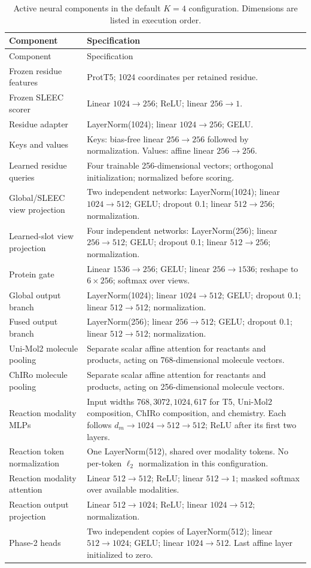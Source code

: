 \begin{longtable}{>{\raggedright\arraybackslash}p{}>{\raggedright\arraybackslash}p{}}
\caption{Active neural components in the default $K=4$ configuration.
Dimensions are listed in execution order.}\label{tab:v4-layers}\\
\toprule
Component & Specification\\
\midrule
\endfirsthead
\toprule Component & Specification\\\midrule
\endhead
Frozen residue features & ProtT5; 1024 coordinates per retained residue.\\
Frozen SLEEC scorer & Linear $1024\to256$; ReLU; linear $256\to1$.\\
Residue adapter & LayerNorm(1024); linear $1024\to256$; GELU.\\
Keys and values & Keys: bias-free linear $256\to256$ followed by normalization. Values: affine linear $256\to256$.\\
Learned residue queries & Four trainable 256-dimensional vectors; orthogonal initialization; normalized before scoring.\\
Global/SLEEC view projection & Two independent networks: LayerNorm(1024); linear $1024\to512$; GELU; dropout 0.1; linear $512\to256$; normalization.\\
Learned-slot view projection & Four independent networks: LayerNorm(256); linear $256\to512$; GELU; dropout 0.1; linear $512\to256$; normalization.\\
Protein gate & Linear $1536\to256$; GELU; linear $256\to1536$; reshape to $6\times256$; softmax over views.\\
Global output branch & LayerNorm(1024); linear $1024\to512$; GELU; dropout 0.1; linear $512\to512$; normalization.\\
Fused output branch & LayerNorm(256); linear $256\to512$; GELU; dropout 0.1; linear $512\to512$; normalization.\\
Uni-Mol2 molecule pooling & Separate scalar affine attention for reactants and products, acting on 768-dimensional molecule vectors.\\
ChIRo molecule pooling & Separate scalar affine attention for reactants and products, acting on 256-dimensional molecule vectors.\\
Reaction modality MLPs & Input widths $768,3072,1024,617$ for T5, Uni-Mol2 composition, ChIRo composition, and chemistry. Each follows $d_m\to1024\to512\to512$; ReLU after its first two layers.\\
Reaction token normalization & One LayerNorm(512), shared over modality tokens. No per-token $\ell_2$ normalization in this configuration.\\
Reaction modality attention & Linear $512\to512$; ReLU; linear $512\to1$; masked softmax over available modalities.\\
Reaction output projection & Linear $512\to1024$; ReLU; linear $1024\to512$; normalization.\\
Phase-2 heads & Two independent copies of LayerNorm(512); linear $512\to1024$; GELU; linear $1024\to512$. Last affine layer initialized to zero.\\
\bottomrule
\end{longtable}

